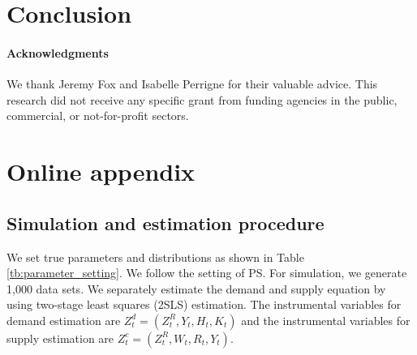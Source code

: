 \documentclass[11pt, a4paper]{article}
\begin{document}
\section{Conclusion}



\paragraph{Acknowledgments}
We thank Jeremy Fox and Isabelle Perrigne for their valuable advice. This research did not receive any specific grant from funding agencies in the public, commercial, or not-for-profit sectors. 

\newpage





\newpage

\setcounter{page}{1}
\appendix
\section{Online appendix}\label{sec:appendix}


\subsection{Simulation and estimation procedure}

We set true parameters and distributions as shown in Table \ref{tb:parameter_setting}. 
We follow the setting of PS. For simulation, we generate 1,000 data sets.
We separately estimate the demand and supply equation by using two-stage least squares (2SLS) estimation.
The instrumental variables for demand estimation are $Z^{d}_{t} = (Z^{R}_{t}, Y_t, H_{t}, K_{t})$ and the instrumental variables for supply estimation are $Z^{c}_{t} = (Z^{R}_{t}, W_{t}, R_{t}, Y_t)$. 
\end{document}
